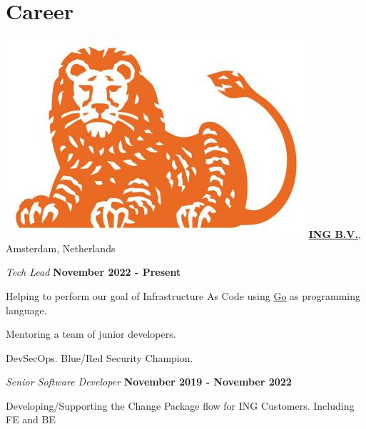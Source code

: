 \section{Career}
%
\includegraphics[scale=0.1]{companies/ing} \href{https://www.ing.nl/}{\textbf{ING B.V.}},
Amsterdam, Netherlands
\begin{outerlist}
        \item[] \textit{Tech Lead}
        \hfill \textbf{November 2022 - Present}

        \begin{innerlist}
                \item Helping to perform our goal of Infrastructure As Code using \href{https://go.dev/}{Go} as programming language.
                \item Mentoring a team of junior developers.
                \item DevSecOps. Blue/Red Security Champion.

        \end{innerlist}

\end{outerlist}
\begin{outerlist}
        \item[] \textit{Senior Software Developer}
        \hfill \textbf{November 2019 - November 2022}

        \begin{innerlist}
                \item Developing/Supporting the Change Package flow for ING Customers.
                Including FE and BE

        \end{innerlist}

\end{outerlist}


